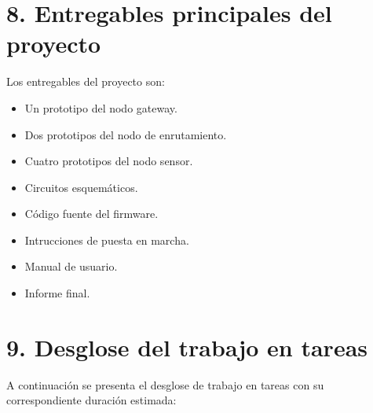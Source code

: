 \documentclass[
11pt, %
codirector, %
]{charter}
\begin{document}
\section{8. Entregables principales del proyecto}
\label{sec:entregables}

Los entregables del proyecto son:

\begin{itemize}
	\item Un prototipo del nodo gateway.
	\item Dos prototipos del nodo de enrutamiento.
	\item Cuatro prototipos del nodo sensor.
	\item Circuitos esquemáticos.
	\item Código fuente del firmware.
	\item Intrucciones de puesta en marcha.
	\item Manual de usuario.
	\item Informe final.
\end{itemize}


\section{9. Desglose del trabajo en tareas}
\label{sec:wbs}

A continuación se presenta el desglose de trabajo en tareas con su correspondiente duración estimada:
\end{document}

